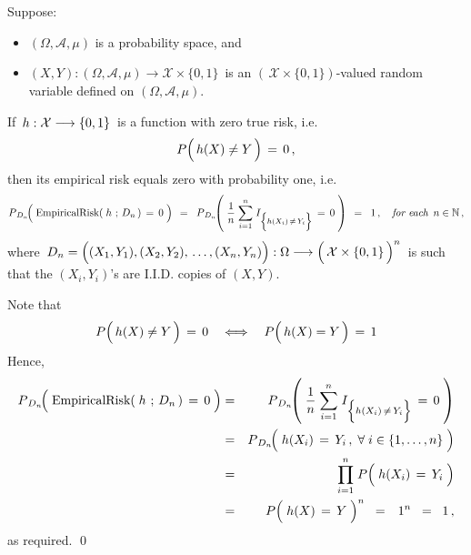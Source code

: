 \vskip 1.0cm
\begin{lemma}
\mbox{}\vskip 0.1cm
\noindent
Suppose:
\begin{itemize}
\item
	$(\Omega,\mathcal{A},\mu)$ is a probability space, and
\item
	$(X,Y) : (\Omega,\mathcal{A},\mu) \longrightarrow \mathcal{X}\times\{0,1\}$\,
	is an $\left(\,\mathcal{X}\times\{0,1\}\right)$-valued random variable
	defined on $(\Omega,\mathcal{A},\mu)$.
\end{itemize}
If \,$h : \mathcal{X} \overset{{\color{white}-}}{\longrightarrow} \{0,1\}$\,
is a function with zero true risk, i.e.
\begin{equation*}
P\!\left(\,h(X) \overset{{\color{white}.}}{\neq} Y \,\right) \,=\, 0\,,
\end{equation*}
then its empirical risk equals zero with probability one, i.e.
\begin{equation*}
P_{\,D_{n}}\!\!\left(\;
	\textnormal{EmpiricalRisk}(\;h\,\overset{{\color{white}-}}{;}\,D_{n}\,) \,=\, 0
	\;\right)
\;\, = \;\;
P_{\,D_{n}}\!\!\left(\;
	\dfrac{1}{n}\;\overset{n}{\underset{i=1}{\sum}}\;
	I_{\left\{h(X_{i}) \,\overset{{\color{white}.}}{\neq}\, Y_{i}\right\}} \,=\, 0
	\;\right)
\;\, = \;\;
	1\,,
\quad
\textit{for each \,$n\in\N$}\,,
\end{equation*}
where
\,$D_{n} = \left((X_{1},Y_{1}),(X_{2},Y_{2}),\,\overset{{\color{white}\vert}}{\ldots}\,,(X_{n},Y_{n})\right)
	: \Omega \longrightarrow
	\left(\,\mathcal{X}\overset{{\color{white}.}}{\times}\{0,1\}\,\right)^{n}$\,
is such that the $(X_{i},Y_{i})$'s are I.I.D. copies of $(X,Y)$.
\end{lemma}
\proof
Note that
\begin{equation*}
P\!\left(\,h(X) \overset{{\color{white}.}}{\neq} Y \,\right) \,=\, 0
\quad\Longleftrightarrow\quad
P\!\left(\,h(X) \overset{{\color{white}-}}{=} Y \,\right) \,=\, 1
\end{equation*}
Hence,
\begin{eqnarray*}
P_{\,D_{n}}\!\!\left(\;
	\textnormal{EmpiricalRisk}(\;h\,\overset{{\color{white}-}}{;}\,D_{n}\,) \,=\, 0
	\;\right)
& = &
	P_{\,D_{n}}\!\!\left(\;
		\dfrac{1}{n}\;\overset{n}{\underset{i=1}{\sum}}\;
		I_{\left\{h(X_{i}) \,\overset{{\color{white}.}}{\neq}\, Y_{i}\right\}} \,=\, 0
		\;\right)
\\
& = &
	P_{\,D_{n}}\!\!\left(\;
		h(X_{i}) \,\overset{{\color{white}-}}{=}\, Y_{i}\,,\;\forall\;i\in\{1,\ldots,n\}
		\;\right)
\\
& = &
	\overset{n}{\underset{i=1}{\prod}}\;
	P\!\left(\; h(X_{i}) \,\overset{{\color{white}-}}{=}\, Y_{i} \;\right)
\\
& = &
	P\!\left(\; h(X) \,\overset{{\color{white}-}}{=}\, Y \;\right)^{n}
	\;\; = \;\;\, 1^{n} \;\; = \;\; 1\,,
\end{eqnarray*}
as required.
\qed

